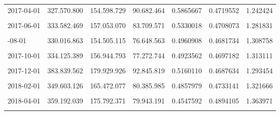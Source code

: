\documentclass[12pt]{article}
\begin{document}
\begin{longtable}[t]{llllrrr}
2017-04-01 & 327.570.800 & 154.598.729 & 90.682.464 & 0.5865667 & 0.4719552 & 1.242424\\
\cellcolor{gray!10}{2017-05-01} & \cellcolor{gray!10}{326.537.000} & \cellcolor{gray!10}{154.731.915} & \cellcolor{gray!10}{65.846.429} & \cellcolor{gray!10}{0.4255517} & \cellcolor{gray!10}{0.4738572} & \cellcolor{gray!10}{1.374016}\\
2017-06-01 & 333.582.469 & 157.053.070 & 83.709.571 & 0.5330018 & 0.4708073 & 1.281831\\
\cellcolor{gray!10}{2017-07-01} & \cellcolor{gray!10}{333.533.428} & \cellcolor{gray!10}{157.343.278} & \cellcolor{gray!10}{79.670.107} & \cellcolor{gray!10}{0.5063458} & \cellcolor{gray!10}{0.4717467} & \cellcolor{gray!10}{1.303577}\\
\addlinespace
2017-08-01 & 330.016.863 & 154.505.115 & 76.648.563 & 0.4960908 & 0.4681734 & 1.308758\\
\cellcolor{gray!10}{2017-09-01} & \cellcolor{gray!10}{335.224.186} & \cellcolor{gray!10}{156.549.485} & \cellcolor{gray!10}{84.095.610} & \cellcolor{gray!10}{0.5371823} & \cellcolor{gray!10}{0.4669994} & \cellcolor{gray!10}{1.275731}\\
2017-10-01 & 334.125.389 & 156.944.793 & 77.272.744 & 0.4923562 & 0.4697182 & 1.313111\\
\cellcolor{gray!10}{2017-11-01} & \cellcolor{gray!10}{348.897.769} & \cellcolor{gray!10}{165.505.188} & \cellcolor{gray!10}{80.827.224} & \cellcolor{gray!10}{0.4883667} & \cellcolor{gray!10}{0.4743659} & \cellcolor{gray!10}{1.320483}\\
2017-12-01 & 383.839.562 & 179.929.926 & 92.845.819 & 0.5160110 & 0.4687634 & 1.293454\\
\addlinespace
\cellcolor{gray!10}{2018-01-01} & \cellcolor{gray!10}{347.816.120} & \cellcolor{gray!10}{161.528.707} & \cellcolor{gray!10}{86.108.698} & \cellcolor{gray!10}{0.5330860} & \cellcolor{gray!10}{0.4644083} & \cellcolor{gray!10}{1.276876}\\
2018-02-01 & 349.603.126 & 165.472.077 & 80.385.985 & 0.4857979 & 0.4733141 & 1.321666\\
\cellcolor{gray!10}{2018-03-01} & \cellcolor{gray!10}{355.419.947} & \cellcolor{gray!10}{170.388.005} & \cellcolor{gray!10}{90.024.238} & \cellcolor{gray!10}{0.5283484} & \cellcolor{gray!10}{0.4793991} & \cellcolor{gray!10}{1.292172}\\
2018-04-01 & 359.192.039 & 175.792.371 & 79.943.191 & 0.4547592 & 0.4894105 & 1.363971\\
\cellcolor{gray!10}{2018-05-01} & \cellcolor{gray!10}{358.130.097} & \cellcolor{gray!10}{173.902.943} & \cellcolor{gray!10}{85.325.752} & \cellcolor{gray!10}{0.4906516} & \cellcolor{gray!10}{0.4855859} & \cellcolor{gray!10}{1.328608}\\

\end{longtable}
\end{document}
